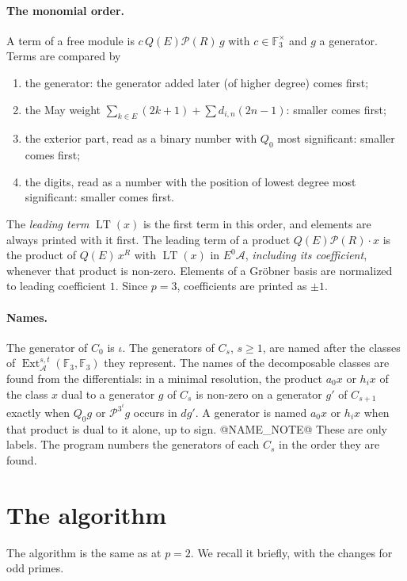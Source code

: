 \documentclass[11pt]{article}
\renewcommand{\P}{\mathcal{P}}
\newcommand{\F}{\mathbb{F}_3}
\newcommand{\A}{\mathcal{A}}
\DeclareMathOperator{\LT}{LT}
\DeclareMathOperator{\Ext}{Ext}
\begin{document}
\paragraph{The monomial order.}
A term of a free module is $c\, Q(E)\P(R)\, g$ with $c \in \F^\times$ and $g$ a generator.
Terms are compared by
\begin{enumerate}
\item the generator: the generator added later (of higher degree) comes first;
\item the May weight $\sum_{k \in E}(2k+1) + \sum d_{i,n}(2n - 1)$: smaller comes first;
\item the exterior part, read as a binary number with $Q_0$ most significant: smaller comes
  first;
\item the digits, read as a number with the position of lowest degree most significant:
  smaller comes first.
\end{enumerate}
The \emph{leading term} $\LT(x)$ is the first term in this order, and elements are always
printed with it first. The leading term of a product $Q(E)\P(R)\cdot x$ is the product of
$Q(E)\,x^R$ with $\LT(x)$ in $E^0\A$, \emph{including its coefficient}, whenever that product
is non-zero. Elements of a Gröbner basis are normalized to leading coefficient $1$. Since
$p = 3$, coefficients are printed as $\pm 1$.

\paragraph{Names.}
The generator of $C_0$ is $\iota$. The generators of $C_s$, $s \ge 1$, are named after the
classes of $\Ext_\A^{s,t}(\F, \F)$ they represent. The names of the decomposable classes are
found from the differentials: in a minimal resolution, the product $a_0 x$ or $h_i x$ of the
class $x$ dual to a generator $g$ of $C_s$ is non-zero on a generator $g'$ of $C_{s+1}$ exactly
when $Q_0 g$ or $\P^{3^i} g$ occurs in $d g'$. A generator is named $a_0 x$ or $h_i x$ when that
product is dual to it alone, up to sign. @NAME_NOTE@
These are only labels. The program numbers the generators of each $C_s$ in the order they are
found.

\section{The algorithm}

The algorithm is the same as at $p = 2$. We recall it briefly, with the changes for odd primes.
\end{document}
